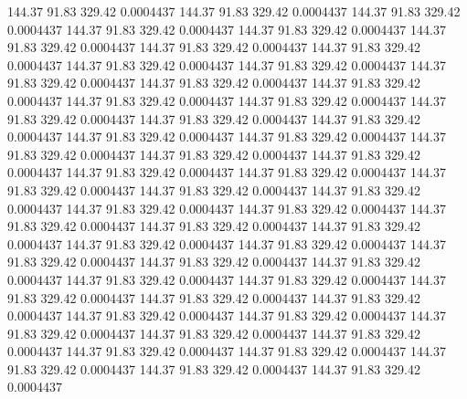  144.37   91.83  329.42   0.0004437
 144.37   91.83  329.42   0.0004437
 144.37   91.83  329.42   0.0004437
 144.37   91.83  329.42   0.0004437
 144.37   91.83  329.42   0.0004437
 144.37   91.83  329.42   0.0004437
 144.37   91.83  329.42   0.0004437
 144.37   91.83  329.42   0.0004437
 144.37   91.83  329.42   0.0004437
 144.37   91.83  329.42   0.0004437
 144.37   91.83  329.42   0.0004437
 144.37   91.83  329.42   0.0004437
 144.37   91.83  329.42   0.0004437
 144.37   91.83  329.42   0.0004437
 144.37   91.83  329.42   0.0004437
 144.37   91.83  329.42   0.0004437
 144.37   91.83  329.42   0.0004437
 144.37   91.83  329.42   0.0004437
 144.37   91.83  329.42   0.0004437
 144.37   91.83  329.42   0.0004437
 144.37   91.83  329.42   0.0004437
 144.37   91.83  329.42   0.0004437
 144.37   91.83  329.42   0.0004437
 144.37   91.83  329.42   0.0004437
 144.37   91.83  329.42   0.0004437
 144.37   91.83  329.42   0.0004437
 144.37   91.83  329.42   0.0004437
 144.37   91.83  329.42   0.0004437
 144.37   91.83  329.42   0.0004437
 144.37   91.83  329.42   0.0004437
 144.37   91.83  329.42   0.0004437
 144.37   91.83  329.42   0.0004437
 144.37   91.83  329.42   0.0004437
 144.37   91.83  329.42   0.0004437
 144.37   91.83  329.42   0.0004437
 144.37   91.83  329.42   0.0004437
 144.37   91.83  329.42   0.0004437
 144.37   91.83  329.42   0.0004437
 144.37   91.83  329.42   0.0004437
 144.37   91.83  329.42   0.0004437
 144.37   91.83  329.42   0.0004437
 144.37   91.83  329.42   0.0004437
 144.37   91.83  329.42   0.0004437
 144.37   91.83  329.42   0.0004437
 144.37   91.83  329.42   0.0004437
 144.37   91.83  329.42   0.0004437
 144.37   91.83  329.42   0.0004437
 144.37   91.83  329.42   0.0004437
 144.37   91.83  329.42   0.0004437
 144.37   91.83  329.42   0.0004437
 144.37   91.83  329.42   0.0004437
 144.37   91.83  329.42   0.0004437
 144.37   91.83  329.42   0.0004437
